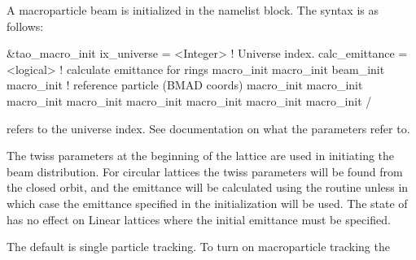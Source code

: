 {{{{{{{{{{{A macroparticle beam is initialized in the  namelist block.
The syntax is as follows:
\begin{example}
  &tao_macro_init
    ix_universe             = <Integer>   ! Universe index.
    calc_emittance          = <logical>   ! calculate emittance for rings
    macro_init%
    macro_init%
    beam_init%
    macro_init%
                                          ! reference particle (BMAD coords)
    macro_init%
    macro_init%
    macro_init%
    macro_init%
    macro_init%
    macro_init%
    macro_init%
    macro_init%
  /
\end{example}
 refers to the universe index. See \bmad documentation
on what the  parameters refer to.

The twiss parameters at the beginning of the lattice are used in
initiating the beam distribution.  For circular lattices the twiss
parameters will be found from the closed orbit, and the emittance will
be calculated using the \bmad routine  unless
 in which case the emittance specified in the
initialization will be used. The state of  has no
effect on Linear lattices where the initial emittance must be
specified.

The default is single particle tracking. To turn on macroparticle
tracking the \vn{global%
This can be placed in the \vn{tao_params} namelist above, for example,
\begin{example}
  &tao_params
    n_v1_var_max  = 5
    n_d2_data_max = 6
    n_data_max    = 2000
    n_var_max     = 2000
    global%
    global%
  /
\end{example}

}}}}}}}}}}}}
